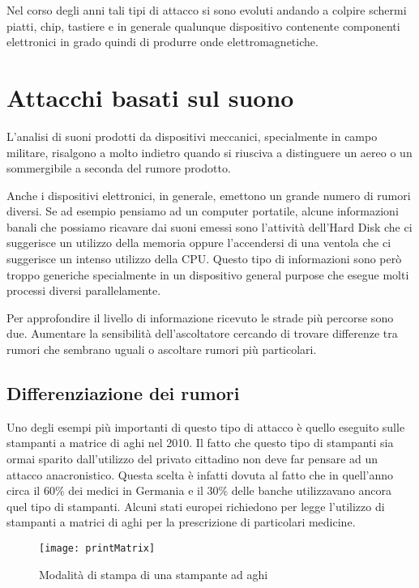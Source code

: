 		Nel corso degli anni tali tipi di attacco si sono evoluti andando a colpire schermi piatti\cite{kuhn2006eavesdropping}, chip\cite{martinasek2012simple}, tastiere\cite{vuagnoux2009compromising} e in generale qualunque dispositivo contenente componenti elettronici in grado quindi di produrre onde elettromagnetiche.
			
	\section{Attacchi basati sul suono}
		L'analisi di suoni prodotti da dispositivi meccanici, specialmente in campo militare, risalgono a molto indietro quando si riusciva a distinguere un aereo o un sommergibile a seconda del rumore prodotto.
	
		Anche i dispositivi elettronici, in generale, emettono un grande numero di rumori diversi. Se ad esempio pensiamo ad un computer portatile, alcune informazioni banali che possiamo ricavare dai suoni emessi sono l'attività dell'Hard Disk che ci suggerisce un utilizzo della memoria oppure l'accendersi di una ventola che ci suggerisce un intenso utilizzo della CPU. Questo tipo di informazioni sono però troppo generiche specialmente in un dispositivo general purpose che esegue molti processi diversi parallelamente.
	
		Per approfondire il livello di informazione ricevuto le strade più percorse sono due. Aumentare la sensibilità dell'ascoltatore cercando di trovare differenze tra rumori che sembrano uguali o ascoltare rumori più particolari.
	
		\subsection{Differenziazione dei rumori}	
			Uno degli esempi più importanti di questo tipo di attacco è quello eseguito sulle stampanti a matrice di aghi nel 2010\cite{backes2010acoustic}. Il fatto che questo tipo di stampanti sia ormai sparito dall'utilizzo del privato cittadino non deve far pensare ad un attacco anacronistico. Questa scelta è infatti dovuta al fatto che in quell'anno circa il $60\%$ dei medici in Germania e il $30\%$ delle banche utilizzavano ancora quel tipo di stampanti. Alcuni stati europei richiedono per legge l'utilizzo di stampanti a matrici di aghi per la prescrizione di particolari medicine\cite{bernatzky2011schmerzbehandlung}.
			
			\begin{figure}
				\begin{center}
					\texttt{[image: printMatrix]}
					\caption{Modalità di stampa di una stampante ad aghi}
					\label{fig:matrixHead}
				\end{center}
			\end{figure}
			
